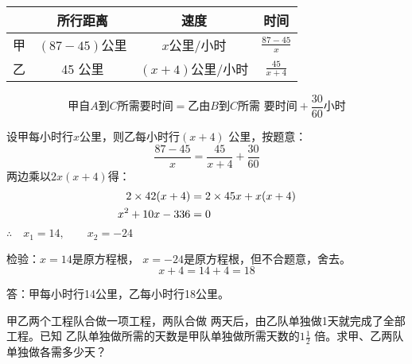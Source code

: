 \begin{analyze}
\begin{center}
\end{center}
\begin{center}
\begin{tabular}{cccc}
    \hline
    & 所行距离 &  速度 & 时间\\
    \hline
    甲&    $(87-45)$公里&    $x$公里/小时   & $\tfrac{87-45}{x}$   \\
    乙& 45 公里&     $(x+4)$公里/小时&    $\tfrac{45}{x+4}$   \\
    \hline
\end{tabular}    
\end{center}

\[\text{甲自$A$到$C$所需要时间}=\text{乙由$B$到$C$所需
要时间}+\frac{30}{60}\text{小时}\]
\end{analyze}

\begin{solution}
    设甲每小时行$x$公里，则乙每小时行$(x+4)$
公里，按题意：
\[\frac{87-45}{x}=\frac{45}{x+4}+\frac{30}{60}  \]
两边乘以$2x(x+4)$得：
\[\begin{split}
    2\times 42(x+4) &=2\times 45x+x(x+4)\\
    x^2+10x-336&=0
\end{split}\]
$\therefore\quad x_1=14,\qquad x_2=-24$

检验：$x=14$是原方程根，
$x=-24$是原方程根，但不合题意，舍去。
\[x+4=14+4=18\]

答：甲每小时行14公里，乙每小时行18公里。
\end{solution}

\begin{example}
    甲乙两个工程队合做一项工程，两队合做
两天后，由乙队单独做1天就完成了全部工程。已知
乙队单独做所需的天数是甲队单独做所需天数的$1\frac{1}{2}$
倍。求甲、乙两队单独做各需多少天？
\end{example}


